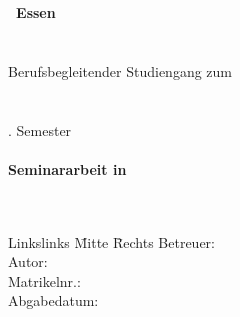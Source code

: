 \begin{titlepage}
	
		\noindent \textbf{\myHochschulName~Essen}\\
		\noindent \textbf{\myHochschulStandort}\\
		\vspace{1cm}\\
		\noindent Berufsbegleitender Studiengang zum\\
		\noindent\myAkademischerGrad~\myStudiengang \\ 
		\vspace{1cm} \\		
		\mySemesterZahl. Semester\\
		\vspace{0.5cm}\\
		\textbf{Seminararbeit in \myLehrveranstaltung}\\
		\vspace{2cm}\\
		\Huge{\myTitel}\\
		\vspace{0.2cm}
	\normalsize
	\vfill
	\begin{tabbing}
		Linkslinks \= Mitte \= Rechts\kill
		Betreuer: \> \> \myBetreuer\\
		Autor: \> \> \myAutor\\
		Matrikelnr.: \> \>   \myMatrikelNr\\
		Abgabedatum: \> \> \myAbgabeDatum
	\end{tabbing}
\end{titlepage}